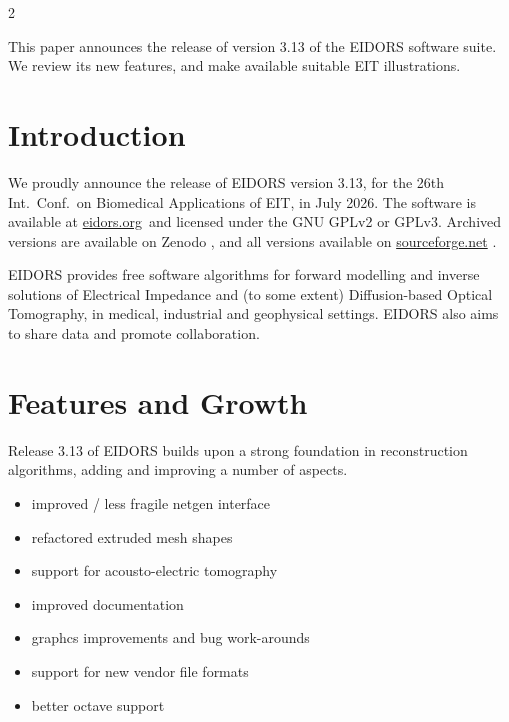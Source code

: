 \documentclass[10pt,a4paper]{article}
\title{\DocumentTitle
\vspace{-1.5ex}} %
\author[1]{\PresentingAuthor}
\affil[1]{Systems and Computer Engineering, Carleton University, Ottawa, Canada, \protect\href{mailto:adler@sce.carleton.ca}{\underline{adler@sce.carleton.ca}}}
\date{} %
\begin{document}
\maketitle
\thispagestyle{firstpage}
\vspace{-1.5cm}
\begin{multicols}{2}

This paper announces the release of version 3.13 of the
EIDORS software suite. We review its new features, and 
make available suitable EIT illustrations.

\section{Introduction}

We proudly announce the release of EIDORS version 3.13,
for the 26th Int.\ Conf.\ on Biomedical Applications of EIT,
in July 2026.
The software is available at \href{www.eidors.org}{eidors.org}\, and licensed under the GNU GPLv2 or GPLv3. Archived versions are available on Zenodo
\cite{eidors3p13, eidors3p12,
      eidors3p11,
      eidors3p10,
      eidors3p9p1,
      eidors3p9,
      eidors3p8}, and all versions available on 
\href{www.sourceforge.net}{sourceforge.net}
\cite{adler2005, adler2006, adler2008}.


EIDORS provides free software algorithms for forward modelling
and inverse solutions
of Electrical Impedance and (to some extent) Diffusion-based Optical Tomography, in
medical, industrial and geophysical settings.
EIDORS also aims to share data and promote
collaboration.

\section{Features and Growth}
Release 3.13 of EIDORS builds upon a strong foundation in reconstruction
algorithms, adding and improving a number of aspects.
\begin{itemize}
\item improved / less fragile netgen interface
\item refactored extruded mesh shapes
\item support for acousto-electric tomography
\item improved documentation
\item graphcs improvements and bug work-arounds
\item support for new vendor file formats
\item better octave support


\end{itemize}
\end{multicols}
\end{document}
